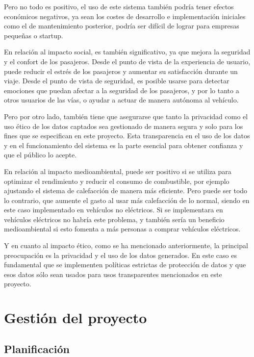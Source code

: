 \documentclass[12pt]{report} %
\begin{document}
Pero no todo es positivo, el uso de este sistema también podría tener efectos económicos negativos, ya sean los costes de desarrollo e implementación iniciales como el de mantenimiento posterior, podría ser difícil de lograr para empresas pequeñas o startup.

En relación al impacto social, es también significativo, ya que mejora la seguridad y el confort de los pasajeros. Desde el punto de vista de la experiencia de usuario, puede reducir el estrés de los pasajeros y aumentar su satisfacción durante un viaje. Desde el punto de vista de seguridad, es posible usarse para detectar emociones que puedan afectar a la seguridad de los pasajeros, y por lo tanto a otros usuarios de las vías, o ayudar a actuar de manera autónoma al vehículo.

Pero por otro lado, también tiene que asegurarse que tanto la privacidad como el uso ético de los datos captados sea gestionado de manera segura y solo para los fines que se especifican en este proyecto. Esta transparencia en el uso de los datos y en el funcionamiento del sistema es la parte esencial para obtener confianza y que el público lo acepte.

En relación al impacto medioambiental, puede ser positivo si se utiliza para optimizar el rendimiento y reducir el consumo de combustible, por ejemplo ajustando el sistema de calefacción de manera más eficiente. Pero puede ser todo lo contrario, que aumente el gasto al usar más calefacción de lo normal, siendo en este caso implementado en vehículos no eléctricos. Si se implementara en vehículos eléctricos no habría este problema, y también sería un beneficio medioambiental si esto fomenta a más personas a comprar vehículos eléctricos.

Y en cuanto al impacto ético, como se ha mencionado anteriormente, la principal preocupación es la privacidad y el uso de los datos generados. En este caso es fundamental que se implementen políticas estrictas de protección de datos y que esos datos sólo sean usados para usos transparentes mencionados en este proyecto.



\chapter{Gestión del proyecto}

\section{Planificación}
\end{document}
